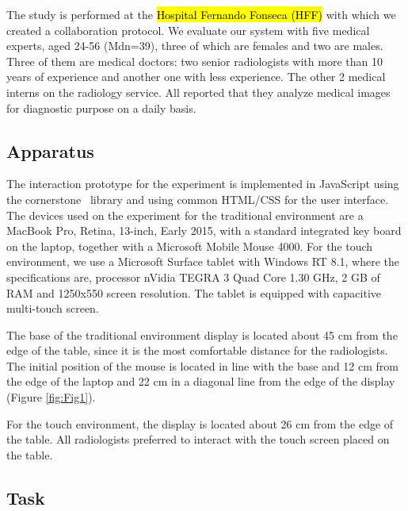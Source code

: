 \documentclass{sigchi}
\begin{document}
The study is performed at the \hl{Hospital Fernando Fonseca (HFF)} with which we created a collaboration protocol. We evaluate our system with five medical experts, aged 24-56 (Mdn=39), three of which are females and two are males. Three of them are medical doctors: two senior radiologists with more than 10 years of experience and another one  with less experience. The other 2 medical  interns on the radiology service. All reported that they analyze medical images for diagnostic purpose on a daily basis.

\subsection{Apparatus}

The interaction prototype for the experiment is implemented in JavaScript using the cornerstone~\cite{cornerstone} library and using common HTML/CSS for the user interface. The devices used on the experiment for the traditional environment are a MacBook Pro, Retina, 13-inch, Early 2015, with a standard integrated key board on the laptop, together with a Microsoft Mobile Mouse 4000. For the touch environment, we use a Microsoft Surface tablet with Windows RT 8.1, where the specifications are, processor nVidia TEGRA 3 Quad Core 1.30 GHz, 2 GB of RAM and 1250x550 screen resolution. The tablet is equipped with capacitive multi-touch screen.

The base of the traditional environment display is located about 45 cm from the edge of the table, since it is the most comfortable distance for the radiologists. The initial position of the mouse is located in line with the base and 12 cm from the edge of the laptop and 22 cm in a diagonal line from the edge of the display (Figure \ref{fig:Fig1}).

For the touch environment, the display is located about 26 cm from the edge of the table. All radiologists preferred to interact with the touch screen placed on the table.

\subsection{Task}
\end{document}
